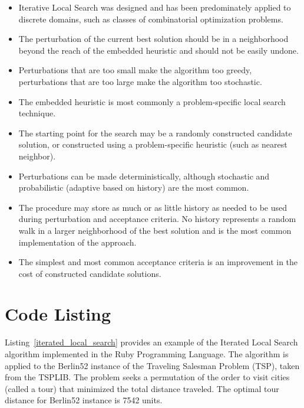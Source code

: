 \documentclass[a4paper, 11pt]{article}
\begin{document}
\begin{itemize}
	\item Iterative Local Search was designed and has been predominately applied to discrete domains, such as classes of combinatorial optimization problems.
	\item The perturbation of the current best solution should be in a neighborhood beyond the reach of the embedded heuristic and should not be easily undone.
	\item Perturbations that are too small make the algorithm too greedy, perturbations that are too large make the algorithm too stochastic.
	\item The embedded heuristic is most commonly a problem-specific local search technique.
	\item The starting point for the search may be a randomly constructed candidate solution, or constructed using a problem-specific heuristic (such as nearest neighbor).
	\item Perturbations can be made deterministically, although stochastic and probabilistic (adaptive based on history) are the most common.
	\item The procedure may store as much or as little history as needed to be used during perturbation and acceptance criteria. No history represents a random walk in a larger neighborhood of the  best solution and is the most common implementation of the approach.
	\item The simplest and most common acceptance criteria is an improvement in the cost of constructed candidate solutions.
\end{itemize}

\section{Code Listing}
\label{sec:code}
Listing~\ref{iterated_local_search} provides an example of the Iterated Local Search algorithm implemented in the Ruby Programming Language. 
The algorithm is applied to the Berlin52 instance of the Traveling Salesman Problem (TSP), taken from the TSPLIB. The problem seeks a permutation of the order to visit cities (called a tour) that minimized the total distance traveled. The optimal tour distance for Berlin52 instance is 7542 units.
\end{document}
